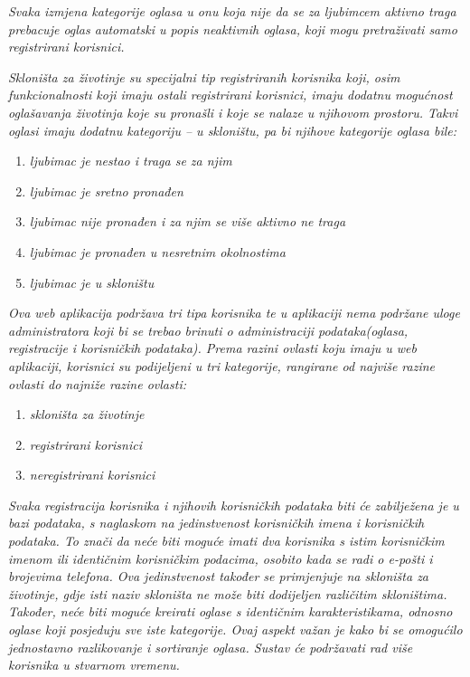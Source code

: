 		\textit{Svaka izmjena kategorije oglasa u onu koja nije da se za ljubimcem aktivno traga prebacuje oglas automatski u popis neaktivnih oglasa, koji mogu pretraživati samo registrirani korisnici.}
		
		\textit{Skloništa za životinje su specijalni tip registriranih korisnika koji, osim funkcionalnosti koji imaju ostali registrirani korisnici, imaju dodatnu mogućnost oglašavanja životinja koje su pronašli i koje se nalaze u njihovom prostoru. Takvi oglasi imaju dodatnu kategoriju – u skloništu, pa bi njihove kategorije oglasa bile:}
		
		\begin{enumerate}
			\item \textit{ljubimac je nestao i traga se za njim}
			\item \textit{ljubimac je sretno pronađen}
			\item \textit{ljubimac nije pronađen i za njim se više aktivno ne traga}
			\item \textit{ljubimac je pronađen u nesretnim okolnostima}
			\item \textit{ljubimac je u skloništu}
		\end{enumerate}
		
		\textit{Ova web aplikacija podržava tri tipa korisnika te u aplikaciji nema podržane uloge administratora koji bi se trebao brinuti o administraciji podataka(oglasa, registracije i korisničkih podataka). Prema razini ovlasti koju imaju u web aplikaciji, korisnici su podijeljeni u tri kategorije, rangirane od najviše razine ovlasti do najniže razine ovlasti:}
		
		\begin{enumerate}
			\item \textit{skloništa za životinje}
			\item \textit{registrirani korisnici}
			\item \textit{neregistrirani korisnici}
		\end{enumerate}
		
		\textit{Svaka registracija korisnika i njihovih korisničkih podataka biti će zabilježena je u bazi podataka, s naglaskom na jedinstvenost korisničkih imena i korisničkih podataka. To znači da neće biti moguće imati dva korisnika s istim korisničkim imenom ili identičnim korisničkim podacima, osobito kada se radi o e-pošti i brojevima telefona. Ova jedinstvenost također se primjenjuje na skloništa za životinje, gdje isti naziv skloništa ne može biti dodijeljen različitim skloništima. Također, neće biti moguće kreirati oglase s identičnim karakteristikama, odnosno oglase koji posjeduju sve iste kategorije. Ovaj aspekt važan je kako bi se omogućilo jednostavno razlikovanje i sortiranje oglasa. Sustav će podržavati rad više korisnika u stvarnom vremenu.}
		
